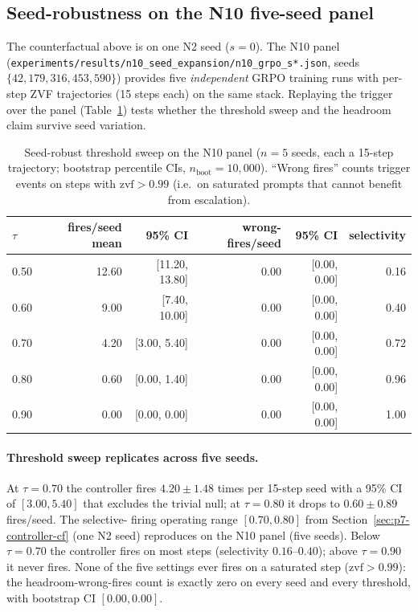 \documentclass{article}
\begin{document}
\subsection{Seed-robustness on the N10 five-seed panel}
\label{sec:p7-controller-seedrobust}
The counterfactual above is on one N2 seed ($s{=}0$). The N10 panel
(\texttt{experiments/results/n10\_seed\_expansion/n10\_grpo\_s*.json},
seeds $\{42, 179, 316, 453, 590\}$) provides five \emph{independent}
GRPO training runs with per-step ZVF trajectories (15 steps each) on
the same stack. Replaying the trigger over the panel
(Table~\ref{tab:p7-seed-robust}) tests whether the threshold sweep and
the headroom claim survive seed variation.

\begin{table}[t]
\centering
\caption{Seed-robust threshold sweep on the N10 panel ($n{=}5$ seeds,
each a 15-step trajectory; bootstrap percentile CIs, $n_{\text{boot}}{=}10{,}000$).
``Wrong fires'' counts trigger events on steps with $\mathrm{zvf} > 0.99$
(i.e.\ on saturated prompts that cannot benefit from escalation).}
\label{tab:p7-seed-robust}
\begin{tabular}{lrrrrr}
\toprule
$\tau$ & fires/seed mean & 95\% CI & wrong-fires/seed & 95\% CI & selectivity \\
\midrule
0.50 & 12.60 & [11.20, 13.80] & 0.00 & [0.00, 0.00] & 0.16 \\
0.60 &  9.00 &  [7.40, 10.00] & 0.00 & [0.00, 0.00] & 0.40 \\
0.70 &  4.20 &  [3.00,  5.40] & 0.00 & [0.00, 0.00] & 0.72 \\
0.80 &  0.60 &  [0.00,  1.40] & 0.00 & [0.00, 0.00] & 0.96 \\
0.90 &  0.00 &  [0.00,  0.00] & 0.00 & [0.00, 0.00] & 1.00 \\
\bottomrule
\end{tabular}
\end{table}

\paragraph{Threshold sweep replicates across five seeds.}
At $\tau{=}0.70$ the controller fires $4.20 \pm 1.48$ times per 15-step
seed with a 95\% CI of $[3.00, 5.40]$ that excludes the trivial null;
at $\tau{=}0.80$ it drops to $0.60 \pm 0.89$ fires/seed. The selective-
firing operating range $[0.70, 0.80]$ from Section~\ref{sec:p7-controller-cf}
(one N2 seed) reproduces on the N10 panel (five seeds). Below $\tau{=}0.70$
the controller fires on most steps (selectivity $0.16$--$0.40$); above
$\tau{=}0.90$ it never fires. None of the five settings ever fires on a
saturated step ($\mathrm{zvf} > 0.99$): the headroom-wrong-fires count is
exactly zero on every seed and every threshold, with bootstrap CI
$[0.00, 0.00]$.
\end{document}
